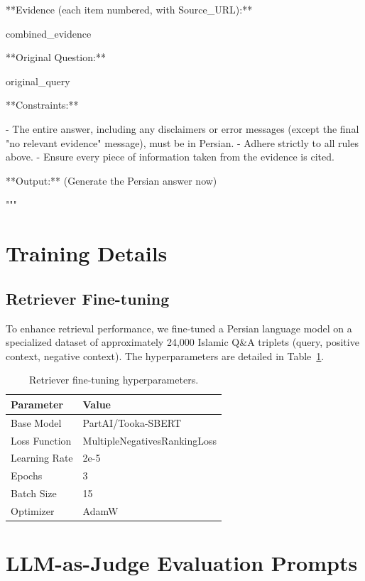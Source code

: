 \documentclass[11pt]{article}
\begin{document}
\begin{PromptBlock}
**Evidence (each item numbered, with Source_URL):**

{combined_evidence}

**Original Question:**

{original_query}

**Constraints:**

- The entire answer, including any disclaimers or error messages (except the final "no relevant evidence" message), must be in Persian.
- Adhere strictly to all rules above.
- Ensure every piece of information taken from the evidence is cited.

**Output:** (Generate the Persian answer now)

"""
\end{PromptBlock}

\section{Training Details}
\label{sec:appendix-training}

\subsection{Retriever Fine-tuning}

To enhance retrieval performance, we fine-tuned a Persian language model on a specialized dataset of approximately 24,000 Islamic Q\&A triplets (query, positive context, negative context). The hyperparameters are detailed in Table~\ref{tab:retriever-hyperparams}.

\begin{table}[t]
\centering
\small
\begin{tabular}{ll}
\hline
\textbf{Parameter} & \textbf{Value} \\
\hline
Base Model & PartAI/Tooka-SBERT \\
Loss Function & MultipleNegativesRankingLoss \\
Learning Rate & 2e-5 \\
Epochs & 3 \\
Batch Size & 15 \\
Optimizer & AdamW \\
\hline
\end{tabular}
\caption{Retriever fine-tuning hyperparameters.}
\label{tab:retriever-hyperparams}
\end{table}

\section{LLM-as-Judge Evaluation Prompts}
\label{sec:appendix-evaluation}
\end{document}
